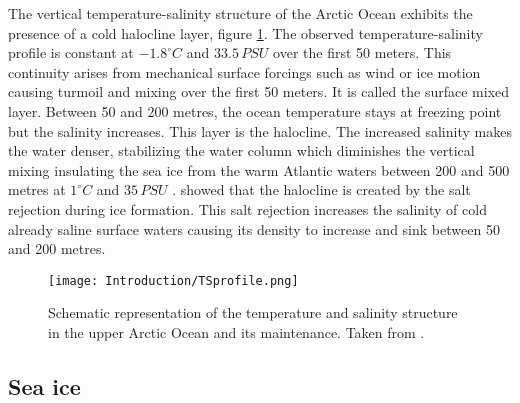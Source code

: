 The vertical temperature-salinity structure of the Arctic Ocean exhibits the presence of a cold halocline layer, figure \ref{tsprofile}. The observed temperature-salinity profile is constant at $-1.8^\circ C$ and $33.5 \, PSU$ over the first 50 meters. This continuity arises from mechanical surface forcings such as wind or ice motion causing turmoil and mixing over the first 50 meters. It is called the surface mixed layer.  Between 50 and 200 metres, the ocean temperature stays at freezing point but the salinity increases. This layer is the halocline. The increased salinity makes the water denser, stabilizing the water column which diminishes the vertical mixing insulating the sea ice from the warm Atlantic waters between 200 and 500 metres at $1 ^\circ C$ and $35\, PSU$ \citep{steele1998}. \citet{halocline} showed that the halocline is created by the salt rejection during ice formation. This salt rejection increases the salinity of cold already saline surface waters causing its density to increase and sink between 50 and 200 metres.

\begin{figure}
\center
\texttt{[image: Introduction/TSprofile.png]}
\caption{Schematic representation of the temperature and salinity structure in the upper Arctic Ocean and its maintenance. Taken from \citet{halocline}.}
\label{tsprofile}
\end{figure}



\subsection{Sea ice}\label{si}

